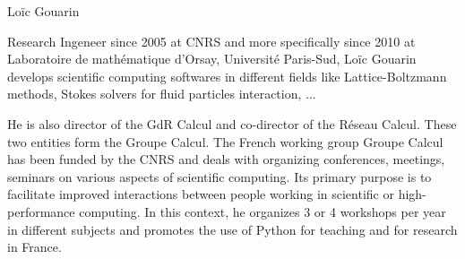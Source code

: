\begin{participant}[type=R,PM=5,gender=male]{Lo\"ic Gouarin}

Research Ingeneer since 2005 at CNRS and more specifically since 2010 at
Laboratoire de mathématique d'Orsay, Université Paris-Sud,
Lo\"ic Gouarin develops scientific computing softwares in different fields like Lattice-Boltzmann methods, Stokes solvers for fluid particles interaction, ...

He is also director of the GdR Calcul and co-director of the Réseau Calcul. These two entities form the Groupe Calcul. The French working group Groupe Calcul has been funded by the CNRS and deals with organizing conferences, meetings, seminars on various aspects of scientific computing.
Its primary purpose is to facilitate improved interactions between people working in scientific or
high-performance computing.
In this context, he organizes 3 or 4 workshops per year in different subjects and promotes the use of Python for teaching and for research in France.
\end{participant}

